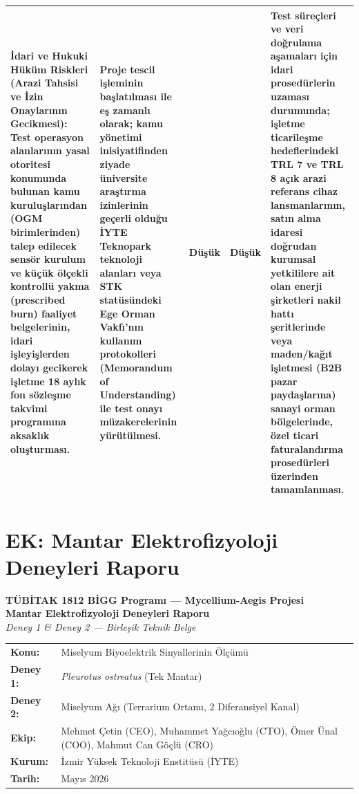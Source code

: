 \documentclass[11pt,a4paper]{article}
\begin{document}
\begin{longtable}{p{3.4cm}p{3.6cm}p{1.4cm}p{1.4cm}p{4.7cm}}
\textbf{İdari ve Hukuki Hüküm Riskleri (Arazi Tahsisi ve İzin Onaylarının Gecikmesi):} Test operasyon alanlarının yasal otoritesi konumunda bulunan kamu kuruluşlarından (OGM birimlerinden) talep edilecek sensör kurulum ve küçük ölçekli kontrollü yakma (prescribed burn) faaliyet belgelerinin, idari işleyişlerden dolayı gecikerek işletme 18 aylık fon sözleşme takvimi programına aksaklık oluşturması. & Proje tescil işleminin başlatılması ile eş zamanlı olarak; kamu yönetimi inisiyatifinden ziyade üniversite araştırma izinlerinin geçerli olduğu İYTE Teknopark teknoloji alanları veya STK statüsündeki Ege Orman Vakfı'nın kullanım protokolleri (Memorandum of Understanding) ile test onayı müzakerelerinin yürütülmesi. & Düşük & Düşük & Test süreçleri ve veri doğrulama aşamaları için idari prosedürlerin uzaması durumunda; işletme ticarileşme hedeflerindeki TRL 7 ve TRL 8 açık arazi referans cihaz lansmanlarının, satın alma idaresi doğrudan kurumsal yetkililere ait olan enerji şirketleri nakil hattı şeritlerinde veya maden/kağıt işletmesi (B2B pazar paydaşlarına) sanayi orman bölgelerinde, özel ticari faturalandırma prosedürleri üzerinden tamamlanması.\\
\bottomrule
\end{longtable}

\clearpage
\appendix
\section*{EK: Mantar Elektrofizyoloji Deneyleri Raporu}

\begin{center}
\textbf{TÜBİTAK 1812 BİGG Programı --- Mycellium-Aegis Projesi}\\[0.3cm]
{\Large\bfseries Mantar Elektrofizyoloji Deneyleri Raporu}\\[0.2cm]
\textit{Deney 1 \& Deney 2 --- Birleşik Teknik Belge}
\end{center}

\vspace{0.5cm}
\begin{tabular}{ll}
\textbf{Konu:} & Miselyum Biyoelektrik Sinyallerinin Ölçümü\\
\textbf{Deney 1:} & \textit{Pleurotus ostreatus} (Tek Mantar)\\
\textbf{Deney 2:} & Miselyum Ağı (Terrarium Ortamı, 2 Diferansiyel Kanal)\\
\textbf{Ekip:} & Mehmet Çetin (CEO), Muhammet Yağcıoğlu (CTO), Ömer Ünal (COO), Mahmut Can Göçlü (CRO)\\
\textbf{Kurum:} & İzmir Yüksek Teknoloji Enstitüsü (İYTE)\\
\textbf{Tarih:} & Mayıs 2026\\
\end{tabular}
\end{document}
